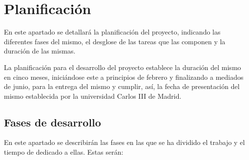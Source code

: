 \chapter{Planificación \label{sec:planificación}}
En este apartado se detallará la planificación del proyecto, indicando las diferentes fases del mismo, el desglose de las tareas que las componen y la duración de las mismas.

La planificación para el desarrollo del proyecto establece la duración del mismo en cinco meses, iniciándose este a principios de febrero y finalizando a mediados de junio, para la entrega del mismo y cumplir, así, la fecha de presentación del mismo establecida por la universidad Carlos III de Madrid.

\section{Fases de desarrollo}
En este apartado se describirán las fases en las que se ha dividido el trabajo y el tiempo de dedicado a ellas. Estas serán:

